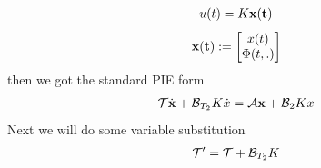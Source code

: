 \documentclass[twocolumn]{autart}    %
\begin{document}
\begin{pf}
    \begin{equation}
        \begin{aligned}
            \setlength{\arraycolsep}{0.9pt}
            u(t) = K\bold{x(t)}
        \end{aligned}
    \end{equation}
    \begin{equation}
        \begin{aligned}
            \setlength{\arraycolsep}{0.9pt}
            \bold{x(t)} := \begin{bmatrix}
                x(t) \\
                \Phi(t,.)
            \end{bmatrix}\nonumber
        \end{aligned}
    \end{equation}
    then we got the standard PIE form 
    \begin{equation}
        \begin{aligned}
            \setlength{\arraycolsep}{0.9pt}
            \mathcal{T}\dot{\bold{x}}+\mathcal{B}_{T_{2}}K\dot{x} = \mathcal{A}\bold{x}+\mathcal{B}_{2}Kx
        \end{aligned}
    \end{equation}
    Next we will do some variable substitution
    \begin{equation}
        \begin{aligned}
            \setlength{\arraycolsep}{0.9pt}
            \mathcal{T}' = \mathcal{T}+\mathcal{B}_{T_{2}}K
        \end{aligned}
    \end{equation}
    

\end{pf}
\end{document}
